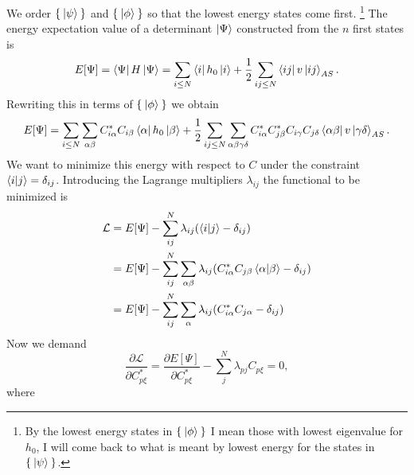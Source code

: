 \documentclass[a4paper,english,12pt]{article}
\newcommand{\p}{\partial}
\newcommand{\pddt}[2]{\frac{\p #1}{\p #2}}
\newcommand{\lagr}{\mathcal{L}}
\newcommand{\be}{\begin{equation}}
\newcommand{\ee}{\end{equation}}
\begin{document}


We order \(\Set{\Ket{\psi}}\) and  \(\Set{\Ket{\phi}}\) so that the lowest energy states come first.
\footnote{By the lowest energy states in $\Set{\Ket{\phi}}$ I mean those with lowest eigenvalue for $h_0$,
I will come back to what is meant by lowest energy for the states in $\Set{\Ket{\psi}}$.}
The energy expectation value of a determinant $\Ket{\Psi}$ constructed from the $n$ first states is
\be\label{Ei} E[\Psi] = \bra{\Psi}H\ket{\Psi} = \sum_{i\leq N}\bra{i}h_0\ket{i} + \frac{1}{2}\sum_{ij\leq N}\bra{ij}v\ket{ij}_{AS}.\ee
Rewriting this in terms of $\Set{\Ket{\phi}}$ we obtain
\be\label{Ea}E[\Psi] = \sum_{i\leq N}\sum_{\alpha\beta}C_{i\alpha}^*C_{i\beta}\bra{\alpha}h_0\ket{\beta} +
\frac{1}{2}\sum_{ij\leq N}\sum_{\alpha\beta\gamma\delta}C_{i\alpha}^*C_{j\beta}^*C_{i\gamma}C_{j\delta}\bra{\alpha\beta}v\ket{\gamma\delta}_{AS}.\ee
We want to minimize this energy with respect to $C$ under the constraint $\braket{i|j} = \delta_{ij}$. Introducing the Lagrange multipliers $\lambda_{ij}$
the functional to be minimized is
\begin{align*}
  \lagr &= E[\Psi] - \sum_{ij}^N\lambda_{ij}(\braket{i|j} - \delta_{ij})\\
  &=  E[\Psi] - \sum_{ij}^N\sum_{\alpha\beta}\lambda_{ij}(C_{i\alpha}^*C_{j\beta}\braket{\alpha|\beta} - \delta_{ij})\\
  &= E[\Psi] - \sum_{ij}^N\sum_{\alpha}\lambda_{ij}(C_{i\alpha}^*C_{j\alpha} - \delta_{ij})
\end{align*} 
Now we demand
\be\label{lag}  \pddt{\lagr}{C^*_{p\xi}} = \pddt{E[\Psi]}{C^*_{p\xi}} - \sum_j^N\lambda_{pj}C_{p\xi} = 0,\ee
where
\end{document}
